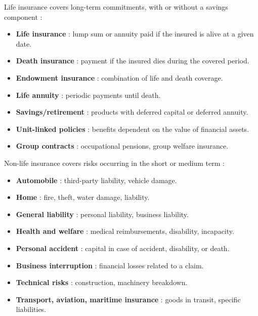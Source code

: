 \begin{f}
	
	Life insurance covers long-term commitments, with or without a savings component :
	\begin{itemize}[nosep]
		\item \textbf{Life insurance} : lump sum or annuity paid if the insured is alive at a given date.
		\item \textbf{Death insurance} : payment if the insured dies during the covered period.
		\item \textbf{Endowment insurance} : combination of life and death coverage.
		\item \textbf{Life annuity} : periodic payments until death.
		\item \textbf{Savings/retirement} : products with deferred capital or deferred annuity.
		\item \textbf{Unit-linked policies} : benefits dependent on the value of financial assets.
		\item \textbf{Group contracts} : occupational pensions, group welfare insurance.
	\end{itemize}
	
	
	Non-life insurance covers risks occurring in the short or medium term :
	\begin{itemize}[nosep]
		\item \textbf{Automobile} : third-party liability, vehicle damage.
		\item \textbf{Home} : fire, theft, water damage, liability.
		\item \textbf{General liability} : personal liability, business liability.
		\item \textbf{Health and welfare} : medical reimbursements, disability, incapacity.
		\item \textbf{Personal accident} : capital in case of accident, disability, or death.
		\item \textbf{Business interruption} : financial losses related to a claim.
		\item \textbf{Technical risks} : construction, machinery breakdown.
		\item \textbf{Transport, aviation, maritime insurance} : goods in transit, specific liabilities.
	\end{itemize}
	

\end{f}

